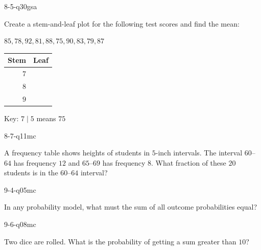 \begin{practiceQuestion}{8-5-q30}{gsa}
\begin{questionText}
Create a stem-and-leaf plot for the following test scores and find the mean:

$85, 78, 92, 81, 88, 75, 90, 83, 79, 87$

\begin{center}
\begin{tabular}{r|l}
\textbf{Stem} & \textbf{Leaf} \\
\hline
$7$ & \\
$8$ & \\
$9$ & \\
\end{tabular}

Key: $7 \mid 5$ means $75$
\end{center}
\end{questionText}
\end{practiceQuestion}

\begin{practiceQuestion}{8-7-q11}{mc}
\begin{questionText}
A frequency table shows heights of students in $5$-inch intervals. The interval $60$--$64$ has frequency $12$ and $65$--$69$ has frequency $8$. What fraction of these $20$ students is in the $60$--$64$ interval?
\end{questionText}
\end{practiceQuestion}

\begin{practiceQuestion}{9-4-q05}{mc}
\begin{questionText}
In any probability model, what must the sum of all outcome probabilities equal?
\end{questionText}
\end{practiceQuestion}

\begin{practiceQuestion}{9-6-q08}{mc}
\begin{questionText}
Two dice are rolled. What is the probability of getting a sum greater than $10$?
\end{questionText}
\end{practiceQuestion}

